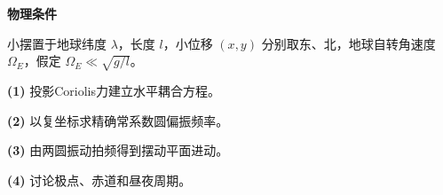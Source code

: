 \textbf{物理条件}\par 小摆置于地球纬度 \(\lambda\)，长度 \(l\)，小位移 \((x,y)\) 分别取东、北，地球自转角速度 \(\Omega_E\)，假定 \(\Omega_E\ll\sqrt{g/l}\)。
\par\noindent\textbf{(1)} 投影Coriolis力建立水平耦合方程。
\par\noindent\textbf{(2)} 以复坐标求精确常系数圆偏振频率。
\par\noindent\textbf{(3)} 由两圆振动拍频得到摆动平面进动。
\par\noindent\textbf{(4)} 讨论极点、赤道和昼夜周期。
